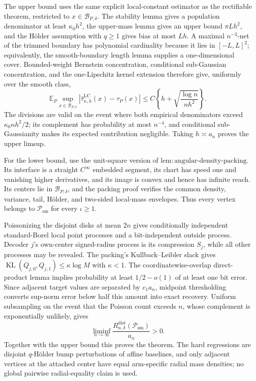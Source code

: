 The upper bound uses the same explicit local-constant estimator as the rectifiable theorem, restricted to \(x\in\mathcal B_{P,\delta}\).  The stability lemma gives a population denominator at least \(\kappa_0h^2\), the upper-mass lemma gives an upper bound \(\pi Lh^2\), and the H\"older assumption with \(q\geq1\) gives bias at most \(Lh\).  A maximal \(n^{-3}\)-net of the trimmed boundary has polynomial cardinality because it lies in \([-L,L]^2\); equivalently, the smooth-boundary length lemma supplies a one-dimensional cover.  Bounded-weight Bernstein concentration, conditional sub-Gaussian concentration, and the one-Lipschitz kernel extension therefore give, uniformly over the smooth class,
\[
 \mathbb E_P\sup_{x\in\mathcal B_{P,\delta}}
 |\widehat\tau^{\mathrm{LC}}_{n,h}(x)-\tau_P(x)|
 \leq C\left\{h+\sqrt{\frac{\log n}{nh^2}}\right\}.
\]
The divisions are valid on the event where both empirical denominators exceed \(\kappa_0nh^2/2\); its complement has probability at most \(n^{-4}\), and conditional sub-Gaussianity makes its expected contribution negligible.  Taking \(h\asymp a_n\) proves the upper limsup.

For the lower bound, use the unit-square version of \(\mathrm{lem:angular\text{-}density\text{-}packing}\).  Its interface is a straight \(C^\infty\) embedded segment, its chart has speed one and vanishing higher derivatives, and its image is convex and hence has infinite reach.  Its centers lie in \(\mathcal B_{P,\delta}\), and the packing proof verifies the common density, variance, tail, H\"older, and two-sided local-mass envelopes.  Thus every vertex belongs to \(\mathcal P_{\mathrm{sm}}\) for every \(\iota\geq1\).

Poissonizing the disjoint disks at mean \(2n\) gives conditionally independent standard-Borel local point processes and a bit-independent outside process.  Decoder \(j\)'s own-center signed-radius process is its compression \(S_j\), while all other processes may be revealed.  The packing's Kullback--Leibler slack gives \(\operatorname{KL}(Q_{j,0},Q_{j,1})\leq\kappa\log M\) with \(\kappa<1\).  The coordinatewise-overlap direct-product lemma implies probability at least \(1/2-o(1)\) of at least one bit error.  Since adjacent target values are separated by \(c_1a_n\), midpoint thresholding converts sup-norm error below half this amount into exact recovery.  Uniform subsampling on the event that the Poisson count exceeds \(n\), whose complement is exponentially unlikely, gives
\[
 \liminf_{n\to\infty}\frac{R_{n,\delta}^{\mathrm{dist}}(\mathcal P_{\mathrm{sm}})}{a_n}>0.
\]
Together with the upper bound this proves the theorem.  The hard regressions are disjoint \(q\)-H\"older bump perturbations of affine baselines, and only adjacent vertices at the attached center have equal arm-specific radial mass densities; no global pairwise radial-equality claim is used.